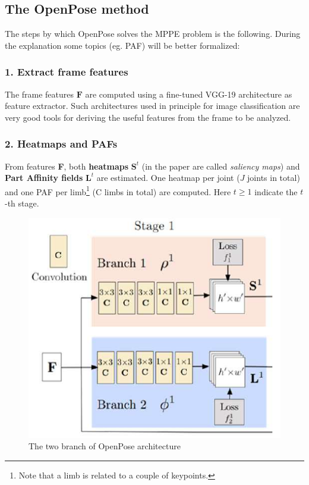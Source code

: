 \subsection{The OpenPose method}
The steps by which OpenPose solves the MPPE problem is the following. During the explanation some topics (eg. PAF) will be better formalized: 

\subsubsection{1. Extract frame features}
The frame features $\mathbf{F}$ are computed using a fine-tuned VGG-19 architecture as feature extractor. Such architectures used in principle for image classification are very good tools for deriving the useful features from the frame to be analyzed.
\subsubsection{2. Heatmaps and PAFs}
From features \textbf{F}, both \textbf{heatmaps} $\mathbf{S}^t$ (in the paper are called \textit{saliency maps}) and \textbf{Part Affinity fields} $\mathbf{L}^t$ are estimated. One heatmap per joint ($J$ joints in total) and one PAF per limb\footnote{
    Note that a limb is related to a couple of keypoints.
} (C limbs in total) are computed. Here $t\ge{1}$ indicate the $t$-th stage. 

\begin{figure}[h]
    \centering
    \includegraphics[scale=1]{img/OpenPose1.png}
    \caption{The two branch of OpenPose architecture}
\end{figure}

